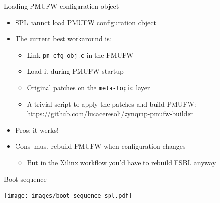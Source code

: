 \documentclass[xetex,table]{beamer}
\begin{document}
\begin{frame}{Loading PMUFW configuration object}
  \begin{itemize}
  \item SPL cannot load PMUFW configuration object
  \item The current best workaround is:
    \begin{itemize}
    \item Link {\tt pm\_cfg\_obj.c} in the PMUFW
    \item Load it during PMUFW startup
    \item Original patches on the
      \href{https://github.com/topic-embedded-products/meta-topic/tree/0b923bdab78c0a9f6c763dab60ead63bd716bea4/recipes-bsp/pmu-firmware}{\tt meta-topic}
      layer
    \item
      A trivial script to apply the patches and build PMUFW:
      {\footnotesize\url{https://github.com/lucaceresoli/zynqmp-pmufw-builder}}
    \end{itemize}
  \item Pros: it works!
  \item Cons: must rebuild PMUFW when configuration changes
    \begin{itemize}
    \item But in the Xilinx workflow you'd have to rebuild FSBL anyway
    \end{itemize}
  \end{itemize}
\end{frame}

\begin{frame}{Boot sequence}
  \begin{center}
    \texttt{[image: images/boot-sequence-spl.pdf]}
  \end{center}
\end{frame}
\end{document}
